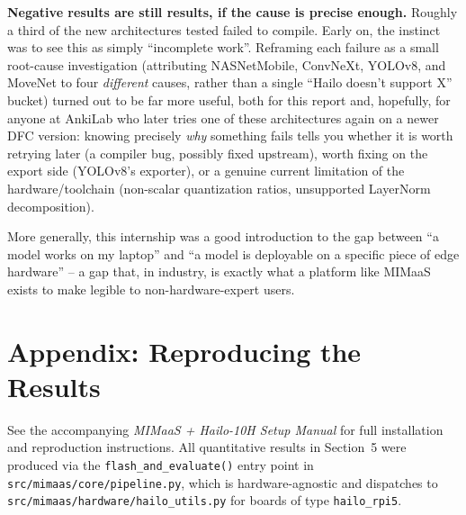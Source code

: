 \documentclass[11pt]{article}
\begin{document}
\textbf{Negative results are still results, if the cause is precise enough.}
Roughly a third of the new architectures tested failed to compile. Early on,
the instinct was to see this as simply ``incomplete work''. Reframing each
failure as a small root-cause investigation (attributing NASNetMobile,
ConvNeXt, YOLOv8, and MoveNet to four \emph{different} causes, rather than a
single ``Hailo doesn't support X'' bucket) turned out to be far more useful,
both for this report and, hopefully, for anyone at AnkiLab who later tries
one of these architectures again on a newer DFC version: knowing precisely
\emph{why} something fails tells you whether it is worth retrying later
(a compiler bug, possibly fixed upstream), worth fixing on the export side
(YOLOv8's exporter), or a genuine current limitation of the hardware/toolchain
(non-scalar quantization ratios, unsupported LayerNorm decomposition).

More generally, this internship was a good introduction to the gap between
``a model works on my laptop'' and ``a model is deployable on a specific
piece of edge hardware'' -- a gap that, in industry, is exactly what a
platform like MIMaaS exists to make legible to non-hardware-expert users.

\appendix
\section*{Appendix: Reproducing the Results}
See the accompanying \emph{MIMaaS + Hailo-10H Setup Manual} for full
installation and reproduction instructions. All quantitative results in
Section~5 were produced via the \texttt{flash\_and\_evaluate()} entry point in
\texttt{src/mimaas/core/pipeline.py}, which is hardware-agnostic and dispatches
to \texttt{src/mimaas/hardware/hailo\_utils.py} for boards of type
\texttt{hailo\_rpi5}.
\end{document}
